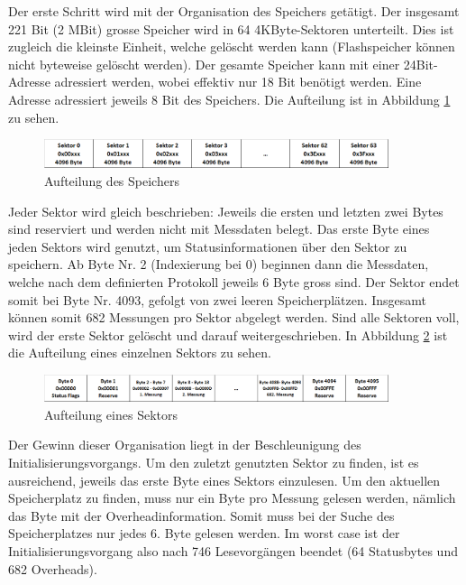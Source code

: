 Der erste Schritt wird mit der Organisation des Speichers getätigt. Der insgesamt 221 Bit (2 MBit) grosse Speicher wird in 64 4KByte-Sektoren unterteilt. Dies ist zugleich die kleinste Einheit, welche gelöscht werden kann (Flashspeicher können nicht byteweise gelöscht werden). Der gesamte Speicher kann mit einer 24Bit-Adresse adressiert werden, wobei effektiv nur 18 Bit benötigt werden. Eine Adresse adressiert jeweils 8 Bit des Speichers. Die Aufteilung ist in Abbildung \ref{fig:Aufteilung_des_Speichers} zu sehen. 

\begin{figure}[H]
\begin{center}
\includegraphics[width=0.9\textwidth]{images/Software_Tabelle_2.png}
\caption{Aufteilung des Speichers}
\label{fig:Aufteilung_des_Speichers}
\end{center}
\end{figure}

Jeder Sektor wird gleich beschrieben: Jeweils die ersten und letzten zwei Bytes sind reserviert und werden nicht mit Messdaten belegt. Das erste Byte eines jeden Sektors wird genutzt, um Statusinformationen über den Sektor zu speichern. Ab Byte Nr. 2 (Indexierung bei 0) beginnen dann die Messdaten, welche nach dem definierten Protokoll jeweils 6 Byte gross sind. Der Sektor endet somit bei Byte Nr. 4093, gefolgt von zwei leeren Speicherplätzen. Insgesamt können somit 682 Messungen pro Sektor abgelegt werden. Sind alle Sektoren voll, wird der erste Sektor gelöscht und darauf weitergeschrieben. In Abbildung \ref{fig:Aufteilung_eines_Sektors} ist die Aufteilung eines einzelnen Sektors zu sehen.

\begin{figure}[H]
\begin{center}
\includegraphics[width=0.9\textwidth]{images/Software_Tabelle_3.png}
\caption{Aufteilung eines Sektors}
\label{fig:Aufteilung_eines_Sektors}
\end{center}
\end{figure}

Der Gewinn dieser Organisation liegt in der Beschleunigung des Initialisierungsvorgangs. Um den zuletzt genutzten Sektor zu finden, ist es ausreichend, jeweils das erste Byte eines Sektors einzulesen. Um den aktuellen Speicherplatz zu finden, muss nur ein Byte pro Messung gelesen werden, nämlich das Byte mit der Overheadinformation. Somit muss bei der Suche des Speicherplatzes nur jedes 6. Byte gelesen werden. Im \glqq worst case\grqq{}  ist der Initialisierungsvorgang also nach 746 Lesevorgängen beendet (64 Statusbytes und 682 Overheads).


